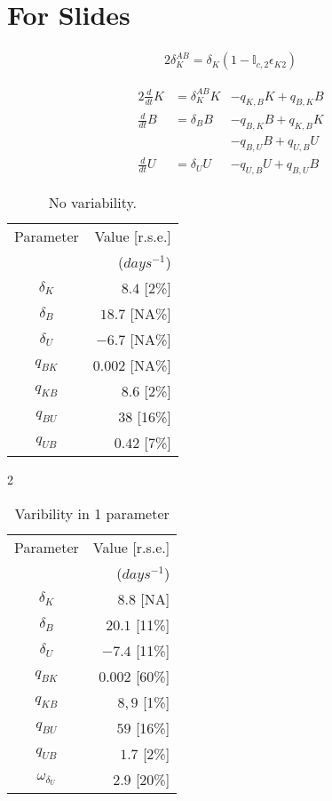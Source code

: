 
\section{For Slides}

\begin{alignat}{2}
\delta_{K}^{AB} = \delta_{K}(1 - \mathbb{I}_{c,2} \epsilon_{K2} )
\end{alignat}

\begin{alignat}{2}
\frac{d}{dt} K &=  \delta_K^{AB}K &- q_{K,B} K + q_{B,K} B \\
\frac{d}{dt} B &=  \delta_B B &- q_{B,K} B + q_{K,B} K \nonumber\\
&              & -q_{B,U} B + q_{U,B} U \\
\frac{d}{dt} U &=  \delta_U U &- q_{U,B} U + q_{B,U} B
\end{alignat}


\begin{table}
	\begin{tabular}{|c|r|}
		\hline
		Parameter & Value [r.s.e.]\\
		& ($days^{-1}$)  \\ \hline
		$\delta_{K}$ & $8.4$ [2\%]\\
		$\delta_{B}$ & $18.7$ [NA\%] \\
		$\delta_{U}$ & $-6.7$ [NA\%] \\
		$q_{BK}$ & $0.002$ [NA\%] \\
		$q_{KB}$ & $8.6$ [2\%] \\
		$q_{BU}$ & $38$ [16\%] \\
		$q_{UB}$ & $0.42$ [7\%] \\
		\hline
	\end{tabular}
	\caption{No variability.}
\end{table}


2
\begin{table}
	\begin{tabular}{|c|r|}
		\hline
		Parameter & Value [r.s.e.]\\ 
		 & ($days^{-1}$)\\ \hline
		$\delta_{K}$ & $8.8$ [NA] \\
		$\delta_{B}$ & $20.1$ [11\%]\\
		$\delta_{U}$ & $-7.4$ [11\%]\\
		$q_{BK}$ & $0.002$ [60\%] \\
		$q_{KB}$ & $8,9$ [1\%] \\
		$q_{BU}$ & $59$ [16\%] \\
		$q_{UB}$ & $1.7$ [2\%] \\ \hline
		$\omega_{\delta_{U}}$ & $2.9$ [20\%]\\
		\hline
	\end{tabular}
	\caption{Varibility in 1 parameter}
\end{table}




